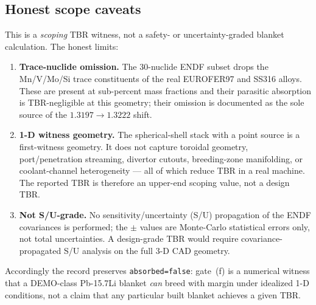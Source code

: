 \subsection{Honest scope caveats}
\label{app:tbr:caveats}

This is a \emph{scoping} TBR witness, not a safety- or
uncertainty-graded blanket calculation. The honest limits:
\begin{enumerate}\itemsep0.2em
\item \textbf{Trace-nuclide omission.} The 30-nuclide ENDF subset drops the
  Mn/V/Mo/Si trace constituents of the real EUROFER97 and SS316 alloys. These
  are present at sub-percent mass fractions and their parasitic absorption is
  TBR-negligible at this geometry; their omission is documented as the sole
  source of the $1.3197\to1.3222$ shift.
\item \textbf{1-D witness geometry.} The spherical-shell stack with a point
  source is a first-witness geometry. It does not capture toroidal geometry,
  port/penetration streaming, divertor cutouts, breeding-zone
  manifolding, or coolant-channel heterogeneity --- all of which reduce TBR in
  a real machine. The reported TBR is therefore an upper-end scoping value, not
  a design TBR.
\item \textbf{Not S/U-grade.} No sensitivity/uncertainty (S/U) propagation of
  the ENDF covariances is performed; the $\pm$ values are Monte-Carlo
  statistical errors only, not total uncertainties. A design-grade TBR would
  require covariance-propagated S/U analysis on the full 3-D CAD geometry.
\end{enumerate}
Accordingly the record preserves \texttt{absorbed=false}: gate~(f) is a
numerical witness that a DEMO-class Pb-15.7Li blanket \emph{can} breed with
margin under idealized 1-D conditions, not a claim that any particular built
blanket achieves a given TBR.
